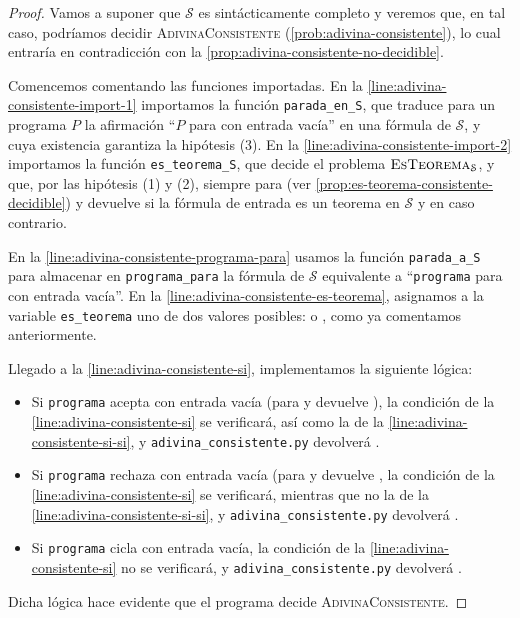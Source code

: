 \begin{proof}
Vamos a suponer que $\mathcal{S}$ es sintácticamente completo y veremos que, en tal caso, podríamos decidir \textsc{AdivinaConsistente} (\cref{prob:adivina-consistente}), lo cual entraría en contradicción con la \cref{prop:adivina-consistente-no-decidible}.

Comencemos comentando las funciones importadas. En la \cref{line:adivina-consistente-import-1} importamos la función \texttt{parada\_en\_S}, que traduce para un programa $P$ la afirmación ``$P$ para con entrada vacía'' en una fórmula de $\mathcal{S}$, y cuya existencia garantiza la hipótesis (3). En la \cref{line:adivina-consistente-import-2} importamos la función \texttt{es\_teorema\_S}, que decide el problema $\textsc{EsTeorema}_\mathcal{S}$, y que, por las hipótesis (1) y (2), siempre para (ver \cref{prop:es-teorema-consistente-decidible}) y devuelve  si la fórmula de entrada es un teorema en $\mathcal{S}$ y  en caso contrario.

En la \cref{line:adivina-consistente-programa-para} usamos la función \texttt{parada\_a\_S} para almacenar en \texttt{programa\_para} la fórmula de $\mathcal{S}$ equivalente a ``\texttt{programa} para con entrada vacía''. En la \cref{line:adivina-consistente-es-teorema}, asignamos a la variable \texttt{es\_teorema} uno de dos valores posibles:  o , como ya comentamos anteriormente.

Llegado a la \cref{line:adivina-consistente-si}, implementamos la siguiente lógica:
\begin{itemize}
    \item Si \texttt{programa} acepta con entrada vacía (para y devuelve ), la condición de la \cref{line:adivina-consistente-si} se verificará, así como la de la \cref{line:adivina-consistente-si-si}, y \texttt{adivina\_consistente.py} devolverá .
    \item Si \texttt{programa} rechaza con entrada vacía (para y devuelve , la condición de la \cref{line:adivina-consistente-si} se verificará, mientras que no la de la \cref{line:adivina-consistente-si-si}, y \texttt{adivina\_consistente.py} devolverá .
    \item Si \texttt{programa} cicla con entrada vacía, la condición de la \cref{line:adivina-consistente-si} no se verificará, y \texttt{adivina\_consistente.py} devolverá .
\end{itemize}
Dicha lógica hace evidente que el programa decide \textsc{AdivinaConsistente}.
\end{proof}

